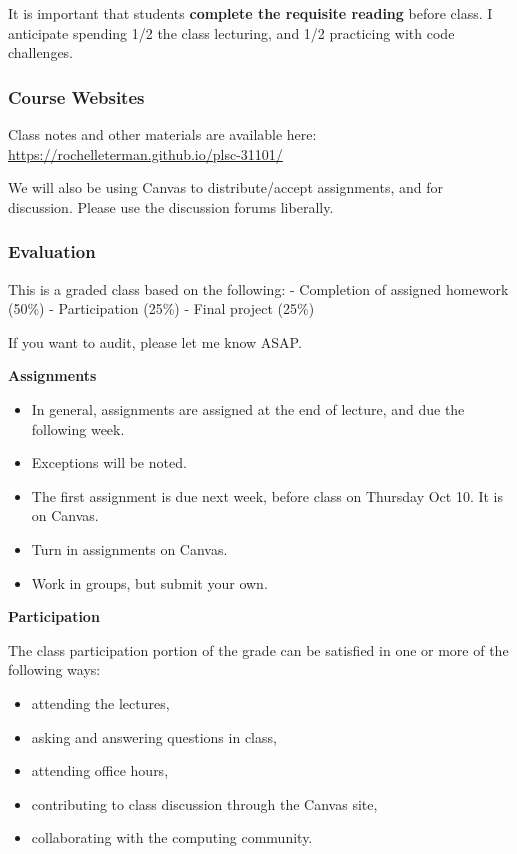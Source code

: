 \documentclass[]{book}
\providecommand{\tightlist}{%
  \setlength{\itemsep}{0pt}\setlength{\parskip}{0pt}}
\begin{document}
It is important that students \textbf{complete the requisite reading}
before class. I anticipate spending 1/2 the class lecturing, and 1/2
practicing with code challenges.

\subsubsection*{Course Websites}\label{course-websites}

Class notes and other materials are available here:
\url{https://rochelleterman.github.io/plsc-31101/}

We will also be using Canvas to distribute/accept assignments, and for
discussion. Please use the discussion forums liberally.

\subsubsection*{Evaluation}\label{evaluation}

This is a graded class based on the following: - Completion of assigned
homework (50\%) - Participation (25\%) - Final project (25\%)

If you want to audit, please let me know ASAP.

\textbf{Assignments}

\begin{itemize}
\tightlist
\item
  In general, assignments are assigned at the end of lecture, and due
  the following week.
\item
  Exceptions will be noted.
\item
  The first assignment is due next week, before class on Thursday Oct
  10. It is on Canvas.
\item
  Turn in assignments on Canvas.
\item
  Work in groups, but submit your own.
\end{itemize}

\textbf{Participation}

The class participation portion of the grade can be satisfied in one or
more of the following ways:

\begin{itemize}
\tightlist
\item
  attending the lectures,
\item
  asking and answering questions in class,
\item
  attending office hours,
\item
  contributing to class discussion through the Canvas site,
\item
  collaborating with the computing community.
\end{itemize}
\end{document}
